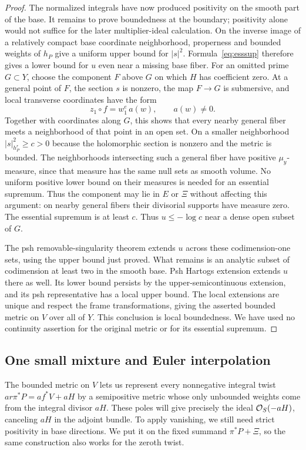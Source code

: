 \begin{proof}
The normalized integrals have now produced positivity on the smooth part of the base. It remains to prove boundedness at the boundary; positivity alone would not suffice for the later multiplier-ideal calculation. On the inverse image of a relatively compact base coordinate neighborhood, properness and bounded weights of $h_P$ give a uniform upper bound for $|s|^2$. Formula~\eqref{eq:esssup} therefore gives a lower bound for $u$ even near a missing base fiber. For an omitted prime $G\subset Y$, choose the component $F$ above $G$ on which $H$ has coefficient zero. At a general point of $F$, the section $s$ is nonzero, the map $F\to G$ is submersive, and local transverse coordinates have the form
\[
z_1\circ f=w_1^e\,a(w),\qquad a(w)\ne0.
\]
Together with coordinates along $G$, this shows that every nearby general fiber meets a neighborhood of that point in an open set. On a smaller neighborhood $|s|_{h_P^r}^2\ge c>0$ because the holomorphic section is nonzero and the metric is bounded. The neighborhoods intersecting such a general fiber have positive $\mu_y$-measure, since that measure has the same null sets as smooth volume. No uniform positive lower bound on their measures is needed for an essential supremum. Thus the component may lie in $E$ or $\Xi$ without affecting this argument: on nearby general fibers their divisorial supports have measure zero. The essential supremum is at least $c$. Thus $u\le-\log c$ near a dense open subset of $G$.

The psh removable-singularity theorem extends $u$ across these codimension-one sets, using the upper bound just proved. What remains is an analytic subset of codimension at least two in the smooth base. Psh Hartogs extension extends $u$ there as well. Its lower bound persists by the upper-semicontinuous extension, and its psh representative has a local upper bound. The local extensions are unique and respect the frame transformations, giving the asserted bounded metric on $V$ over all of $Y$. This conclusion is local boundedness. We have used no continuity assertion for the original metric or for its essential supremum.
\end{proof}

\subsection{One small mixture and Euler interpolation}\label{subsec:interpolation}

The bounded metric on $V$ lets us represent every nonnegative integral twist $ar\pi^*P=af^*V+aH$ by a semipositive metric whose only unbounded weights come from the integral divisor $aH$. These poles will give precisely the ideal $\mathcal O_S(-aH)$, canceling $aH$ in the adjoint bundle. To apply vanishing, we still need strict positivity in base directions. We put it on the fixed summand $\pi^*P+\Xi$, so the same construction also works for the zeroth twist.


